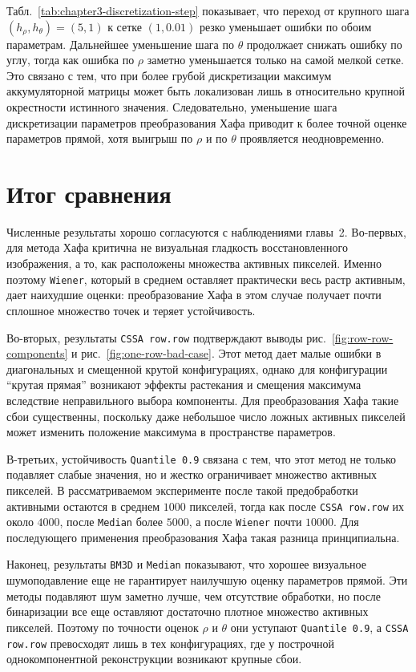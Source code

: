 Табл.~\ref{tab:chapter3-discretization-step} показывает, что переход от
крупного шага $(h_\rho, h_\theta)=(5, 1)$ к сетке $(1, 0.01)$ резко уменьшает
ошибки по обоим параметрам. Дальнейшее уменьшение шага по $\theta$ продолжает
снижать ошибку по углу, тогда как ошибка по $\rho$ заметно уменьшается только
на самой мелкой сетке. Это связано с тем, что при более грубой дискретизации
максимум аккумуляторной матрицы может быть локализован лишь в относительно
крупной окрестности истинного значения. Следовательно, уменьшение шага
дискретизации параметров преобразования Хафа приводит к более точной оценке
параметров прямой, хотя выигрыш по $\rho$ и по $\theta$ проявляется
неодновременно.

\section{Итог сравнения}

Численные результаты хорошо согласуются с наблюдениями главы~2. Во-первых,
для метода Хафа критична не визуальная гладкость восстановленного
изображения, а то, как расположены множества активных пикселей.
Именно поэтому \texttt{Wiener}, который в среднем оставляет практически весь
растр активным, дает наихудшие оценки: преобразование Хафа в этом случае
получает почти сплошное множество точек и теряет устойчивость.

Во-вторых, результаты \texttt{CSSA row.row} подтверждают выводы
рис.~\ref{fig:row-row-components} и рис.~\ref{fig:one-row-bad-case}. Этот
метод дает малые ошибки в диагональных и смещенной крутой конфигурациях,
однако для конфигурации ``крутая прямая'' возникают эффекты растекания и
смещения максимума вследствие неправильного выбора компоненты. Для
преобразования Хафа такие сбои существенны, поскольку даже небольшое число
ложных активных пикселей может изменить положение максимума в пространстве
параметров.

В-третьих, устойчивость \texttt{Quantile 0.9} связана с тем, что этот метод
не только подавляет слабые значения, но и жестко ограничивает множество
активных пикселей. В рассматриваемом эксперименте после такой предобработки
активными остаются в среднем $1000$ пикселей, тогда как после
\texttt{CSSA row.row} их около $4000$, после \texttt{Median} более $5000$, а
после \texttt{Wiener} почти $10000$. Для последующего применения
преобразования Хафа такая разница принципиальна.

Наконец, результаты \texttt{BM3D} и \texttt{Median} показывают, что хорошее
визуальное шумоподавление еще не гарантирует наилучшую оценку параметров
прямой. Эти методы подавляют шум заметно лучше, чем отсутствие обработки, но
после бинаризации все еще оставляют достаточно плотное множество активных
пикселей. Поэтому по точности оценок $\rho$ и $\theta$ они уступают
\texttt{Quantile 0.9}, а \texttt{CSSA row.row} превосходят лишь в тех
конфигурациях, где у построчной однокомпонентной реконструкции возникают
крупные сбои.
